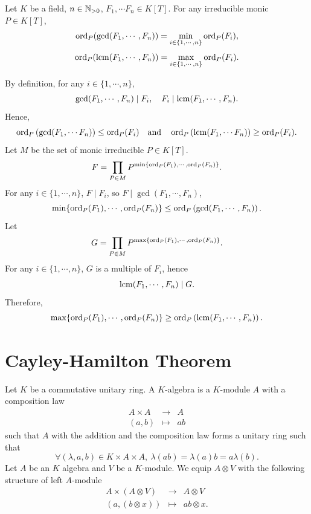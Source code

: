 \begin{propositionenv}
    Let $K$ be a field, $n \in \mathbb{N}_{>0}$, $F_1, \cdots F_n \in K[T]$.
    For any irreducible monic $P \in K[T]$,
    $$\operatorname{\mathrm{ord}}_P(\gcd(F_1,\cdots, F_n)) = \min_{i \in \{1,\cdots,n\}} \operatorname{\mathrm{ord}}_{P}(F_i),$$
    $$\operatorname{\mathrm{ord}}_P(\operatorname{\mathrm{lcm}}(F_1,\cdots, F_n)) = \max_{i \in \{1,\cdots,n\}} \operatorname{\mathrm{ord}}_{P}(F_i).$$
\end{propositionenv}
\begin{proofenv}
    By definition, for any $i \in \{1,\cdots,n\}$,
    $$\gcd(F_1,\cdots, F_n) \mid F_i,\quad F_i \mid \operatorname{\mathrm{lcm}}(F_1,\cdots, F_n).$$
    Hence,
    $$\operatorname{\mathrm{ord}}_P\left(\gcd(F_1, \cdots F_n)\right) \le \operatorname{\mathrm{ord}}_P(F_i) \quad \text{and} \quad \operatorname{\mathrm{ord}}_P\left(\operatorname{\mathrm{lcm}}(F_1, \cdots F_n)\right) \ge \operatorname{\mathrm{ord}}_P(F_i).$$
    Let $M$ be the set of monic irreducible $P \in K[T]$.
    $$F = \prod_{P \in M} P^{\min\{\operatorname{\mathrm{ord}}_P(F_1),\cdots,\operatorname{\mathrm{ord}}_P(F_n)\}}.$$
    For any $i \in \{1,\cdots,n\}$, $F \mid F_i$, so $F \mid \gcd(F_1,\cdots,F_n)$,
    $$\min\{\operatorname{\mathrm{ord}}_{P}(F_1),\cdots, \operatorname{\mathrm{ord}}_{P}(F_n)\} \le \operatorname{\mathrm{ord}}_{P}\left(\gcd(F_1,\cdots,F_n)\right).$$
    Let
    $$G = \prod_{P \in M} P^{\max\{\operatorname{\mathrm{ord}}_P(F_1),\cdots,\operatorname{\mathrm{ord}}_P(F_n)\}}.$$
    For any $i \in \{1,\cdots,n\}$, $G$ is a multiple of $F_i$,
    hence
    $$\operatorname{\mathrm{lcm}}(F_1,\cdots,F_n) \mid G.$$
    Therefore,
    $$\max\{\operatorname{\mathrm{ord}}_P(F_1),\cdots, \operatorname{\mathrm{ord}}_P(F_n)\} \ge \operatorname{\mathrm{ord}}_{P}\left(\operatorname{\mathrm{lcm}}(F_1,\cdots,F_n)\right).$$
\end{proofenv}


\section{Cayley-Hamilton Theorem}


\begin{definitionenv}\label{def:6.2.1}
    Let $K$ be a commutative unitary ring.
    A $K$-algebra is a $K$-module $A$ with a composition law
    $$\begin{array}{rcl}
        A \times A & \to & A\\
        (a,b) & \mapsto & ab
    \end{array}$$
    such that $A$ with the addition and the composition law forms a unitary ring such that
    $$\forall(\lambda,a,b) \in K \times A \times A,\ \lambda(ab) = \lambda(a)b = a\lambda(b).$$
    Let $A$ be an $K$ algebra and $V$ be a $K$-module.
    We equip $A \otimes V$ with the following structure of left $A$-module
    $$\begin{array}{rcl}
        A \times (A \otimes V) & \longrightarrow & A \otimes V\\
        (a,(b \otimes x)) & \longmapsto & ab \otimes x.
    \end{array}$$
\end{definitionenv}


